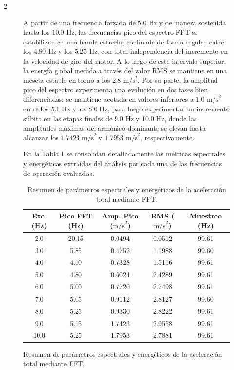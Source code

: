\documentclass[10pt]{article}
\begin{document}
\begin{multicols}{2}
\begin{figure}[ht]
A partir de una frecuencia forzada de $5.0\text{ Hz}$ y de manera sostenida hasta los $10.0\text{ Hz}$, las frecuencias pico del espectro FFT se estabilizan en una banda estrecha confinada de forma regular entre los $4.80\text{ Hz}$ y los $5.25\text{ Hz}$, con total independencia del incremento en la velocidad de giro del motor. A lo largo de este intervalo superior, la energía global medida a través del valor RMS se mantiene en una meseta estable en torno a los $2.8\text{ m/s}^2$. Por su parte, la amplitud pico del espectro experimenta una evolución en dos fases bien diferenciadas: se mantiene acotada en valores inferiores a $1.0\text{ m/s}^2$ entre los $5.0\text{ Hz}$ y los $8.0\text{ Hz}$, para luego experimentar un incremento súbito en las etapas finales de $9.0\text{ Hz}$ y $10.0\text{ Hz}$, donde las amplitudes máximas del armónico dominante se elevan hasta alcanzar los $1.7423\text{ m/s}^2$ y $1.7953\text{ m/s}^2$, respectivamente.

En la Tabla 1 se consolidan detalladamente las métricas espectrales y energéticas extraídas del análisis por cada una de las frecuencias de operación evaluadas.

\begin{table}[t]
\centering
\caption{Resumen de parámetros espectrales y energéticos de la aceleración total mediante FFT.}
\label{tab:resultados_fft}
\small %
\begin{tabular}{ccccc}
\toprule
\textbf{Exc. (Hz)} & \textbf{Pico FFT (Hz)} & \textbf{Amp. Pico ($\text{m/s}^2$)} & \textbf{RMS ($\text{m/s}^2$)} & \textbf{Muestreo (Hz)} \\ 
\midrule
2.0  & 20.15 & 0.0494 & 0.0512 & 99.61 \\
3.0  & 5.85  & 0.4752 & 1.1988 & 99.60 \\
4.0  & 4.10  & 0.7328 & 1.5116 & 99.61 \\
5.0  & 4.80  & 0.6024 & 2.4289 & 99.61 \\
6.0  & 5.00  & 0.7720 & 2.7498 & 99.61 \\
7.0  & 5.05  & 0.9112 & 2.8127 & 99.60 \\
8.0  & 5.25  & 0.9330 & 2.8222 & 99.61 \\
9.0  & 5.15  & 1.7423 & 2.9558 & 99.61 \\
10.0 & 5.25  & 1.7953 & 2.7881 & 99.61 \\ 
\bottomrule
\end{tabular}
\end{table}



\end{figure}
\end{multicols}
\end{document}
